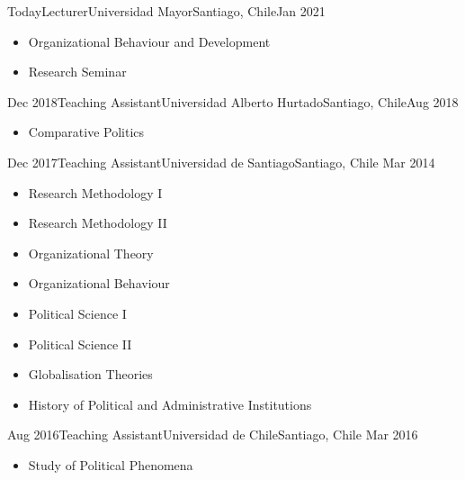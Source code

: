 





\begin{experiences}
  \experience
    {Today}{Lecturer}{Universidad Mayor}{Santiago, Chile}{Jan 2021}
    {\begin{itemize}
    \item Organizational Behaviour and Development
    \item Research Seminar
    \end{itemize}}
    {}
\end{experiences}
\vspace{-2mm}

\begin{experiences}
  \experience
    {Dec 2018}{Teaching Assistant}{Universidad Alberto Hurtado}{Santiago, Chile}{Aug 2018}
    {\begin{itemize}
    \item Comparative Politics
    \end{itemize}}
    {}
\end{experiences}
\vspace{-2mm}

\begin{experiences}
  \emptySeparator 
  \experience 
    {Dec 2017}{Teaching Assistant}{Universidad de Santiago}{Santiago, Chile} {Mar 2014}
    {\begin{itemize}
    \item Research Methodology I
    \item Research Methodology II
    \item Organizational Theory
    \item Organizational Behaviour
    \item Political Science I
    \item Political Science II
	\item Globalisation Theories
	\item History of Political and Administrative Institutions
    \end{itemize}}
    {}
\end{experiences}
\vspace{-2mm}

\begin{experiences}
  \emptySeparator 
  \experience 
    {Aug 2016}{Teaching Assistant}{Universidad de Chile}{Santiago, Chile} {Mar 2016}
    {\begin{itemize}
    \item Study of Political Phenomena
    \end{itemize}}
    {}
\end{experiences}
